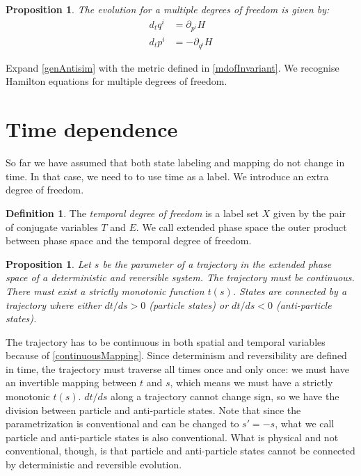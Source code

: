 \documentclass[twocolumn,floatfix,nofootinbib]{revtex4}   %
\theoremstyle{theorem}
\newtheorem{prop}[thm]{Proposition}
\theoremstyle{definition}
\newtheorem{defn}[thm]{Definition}
\begin{document}
\begin{prop}\label{mdofHam}
The evolution for a multiple degrees of freedom is given by:
\begin{align*}
d_{t}q^i &= \partial_{p^i} H \\
d_{t}p^i &= - \partial_{q^i} H
\end{align*}
\end{prop}

Expand \ref{genAntisim} with the metric defined in \ref{mdofInvariant}. We recognise Hamilton equations for multiple degrees of freedom.

\section{Time dependence}
So far we have assumed that both state labeling and mapping do not change in time. In that case, we need to to use time as a label. We introduce an extra degree of freedom.

\begin{defn}\label{tdof}
The \emph{temporal degree of freedom} is a label set $X$ given by the pair of conjugate variables $T$ and $E$. We call extended phase space the outer product between phase space and the temporal degree of freedom.
\end{defn}

\begin{prop}\label{tdofMonotonic}
Let $s$ be the parameter of a trajectory in the extended phase space of a deterministic and reversible system. The trajectory must be continuous. There must exist a strictly monotonic function $t(s)$. States are connected by a trajectory where either $dt/ds>0$ (particle states) or $dt/ds<0$ (anti-particle states).
\end{prop}

The trajectory has to be continuous in both spatial and temporal variables because of \ref{continuousMapping}. Since determinism and reversibility are defined in time, the trajectory must traverse all times once and only once: we must have an invertible mapping between $t$ and $s$, which means we must have a strictly monotonic $t(s)$. $dt/ds$ along a trajectory cannot change sign, so we have the division between particle and anti-particle states. Note that since the parametrization is conventional and can be changed to $s'=-s$, what we call particle and anti-particle states is also conventional. What is physical and not conventional, though, is that particle and anti-particle states cannot be connected by deterministic and reversible evolution.
\end{document}
